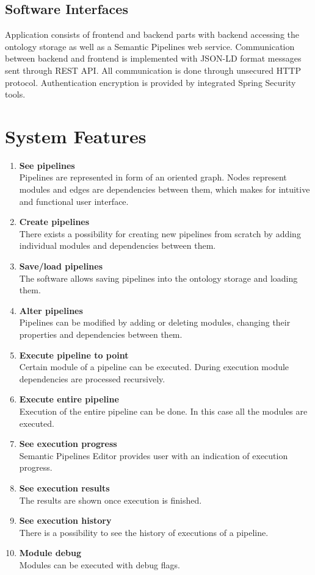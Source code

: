 \documentclass{article}
\begin{document}
\subsection{Software Interfaces}
Application consists of frontend and backend parts with backend accessing the ontology storage as well as a Semantic Pipelines web service. Communication between backend and frontend is implemented with JSON-LD format messages sent through REST API. All communication is done through unsecured HTTP protocol. Authentication encryption is provided by integrated Spring Security tools. 
\section{System Features}
\label{sec:features}
\begin{enumerate}
    \item \textbf{See pipelines}\\
	Pipelines are represented in form of an oriented graph. Nodes represent modules and edges are dependencies between them, which makes for intuitive and functional user interface.
    \item \textbf{Create pipelines}\\
	There exists a possibility for creating new pipelines from scratch by adding individual modules and dependencies between them.
    \item \textbf{Save/load pipelines}\\
	The software allows saving pipelines into the ontology storage and loading them.
    \item \textbf{Alter pipelines}\\
	Pipelines can be modified by adding or deleting modules, changing their properties and dependencies between them.
    \item \textbf{Execute pipeline to point}\\
	Certain module of a pipeline can be executed. During execution module dependencies are processed recursively.
    \item \textbf{Execute entire pipeline}\\
	Execution of the entire pipeline can be done. In this case all the modules are executed.
    \item \textbf{See execution progress}\\
	Semantic Pipelines Editor provides user with an indication of execution progress.
    \item \textbf{See execution results}\\
	The results are shown once execution is finished.
    \item \textbf{See execution history}\\
	There is a possibility to see the history of executions of a pipeline.
    \item \textbf{Module debug}\\
	Modules can be executed with debug flags.
\end{enumerate}
\end{document}
